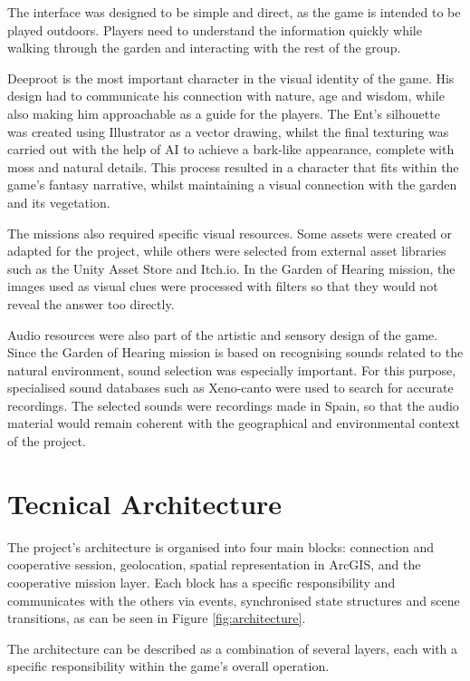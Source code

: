 The interface was designed to be simple and direct, as the game is intended to be played outdoors. Players need to understand the information quickly while walking through the garden and interacting with the rest of the group. 

Deeproot is the most important character in the visual identity of the game. His design had to communicate his connection with nature, age and wisdom, while also making him approachable as a guide for the players. The Ent’s silhouette was created using Illustrator as a vector drawing, whilst the final texturing was carried out with the help of AI to achieve a bark-like appearance, complete with moss and natural details. This process resulted in a character that fits within the game’s fantasy narrative, whilst maintaining a visual connection with the garden and its vegetation.

The missions also required specific visual resources. Some assets were created or adapted for the project, while others were selected from external asset libraries such as the Unity Asset Store and Itch.io. In the Garden of Hearing mission, the images used as visual clues were processed with filters so that they would not reveal the answer too directly.

Audio resources were also part of the artistic and sensory design of the game. Since the Garden of Hearing mission is based on recognising sounds related to the natural environment, sound selection was especially important. For this purpose, specialised sound databases such as Xeno-canto were used to search for accurate recordings. The selected sounds were recordings made in Spain, so that the audio material would remain coherent with the geographical and environmental context of the project.


\section{Tecnical Architecture}
The project’s architecture is organised into four main blocks: connection and cooperative session, geolocation, spatial representation in ArcGIS, and the cooperative mission layer. Each block has a specific responsibility and communicates with the others via events, synchronised state structures and scene transitions, as can be seen in Figure \ref{fig:architecture}.

The architecture can be described as a combination of several layers, each with a specific responsibility within the game’s overall operation.

